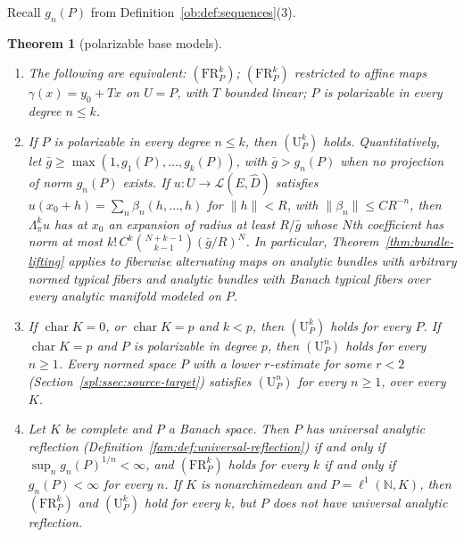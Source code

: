 \documentclass[11pt]{amsart}
\newtheorem{theorem}{Theorem}[section]
\theoremstyle{definition}
\theoremstyle{remark}
\numberwithin{equation}{section}
\newcommand{\N}{\mathbb N}
\newcommand{\cL}{\mathcal L}
\newcommand{\norm}[1]{\lVert #1\rVert}
\theoremstyle{plain}
\theoremstyle{definition}
\theoremstyle{plain}
\begin{document}
Recall $g_n(P)$ from Definition~\ref{ob:def:sequences}(3).

\begin{theorem}[polarizable base models]\label{fam2:thm:polarizable}
\begin{enumerate}
\item The following are equivalent: $(\mathrm{FR}^k_P)$; $(\mathrm{FR}^k_P)$ restricted to affine maps
$\gamma(x)=y_0+Tx$ on $U=P$, with $T$ bounded linear; $P$ is polarizable in every degree $n\le k$.
\item If $P$ is polarizable in every degree $n\le k$, then $(\mathrm U^k_P)$ holds. Quantitatively, let
$\bar g\ge\max(1,g_1(P),\dots,g_k(P))$, with $\bar g>g_n(P)$ when no projection of norm $g_n(P)$ exists. If
$u\colon U\to\cL(E,\widehat D)$ satisfies $u(x_0+h)=\sum_n\beta_n(h,\dots,h)$ for $\norm h<R$, with
$\norm{\beta_n}\le CR^{-n}$, then $\Lambda^k_\pi u$ has at $x_0$ an expansion of radius at least $R/\bar g$ whose $N$th
coefficient has norm at most $k!\,C^k\binom{N+k-1}{k-1}(\bar g/R)^N$. In particular, Theorem~\ref{thm:bundle-lifting}
applies to fiberwise alternating maps on analytic bundles with arbitrary normed typical fibers and analytic bundles with
Banach typical fibers over every analytic manifold modeled on $P$.
\item If $\operatorname{char}K=0$, or $\operatorname{char}K=p$ and $k<p$, then $(\mathrm U^k_P)$ holds for every $P$. If
$\operatorname{char}K=p$ and $P$ is polarizable in degree $p$, then $(\mathrm U^n_P)$ holds for every $n\ge1$. Every normed
space $P$ with a lower $r$-estimate for some $r<2$ (Section~\ref{spl:ssec:source-target}) satisfies $(\mathrm U^n_P)$ for
every $n\ge1$, over every $K$.
\item Let $K$ be complete and $P$ a Banach space. Then $P$ has universal analytic reflection
(Definition~\ref{fam:def:universal-reflection}) if and only if $\sup_ng_n(P)^{1/n}<\infty$, and $(\mathrm{FR}^k_P)$ holds
for every $k$ if and only if $g_n(P)<\infty$ for every $n$. If $K$ is nonarchimedean and $P=\ell^1(\N,K)$, then
$(\mathrm{FR}^k_P)$ and $(\mathrm U^k_P)$ hold for every $k$, but $P$ does not have universal analytic reflection.
\end{enumerate}
\end{theorem}
\end{document}
